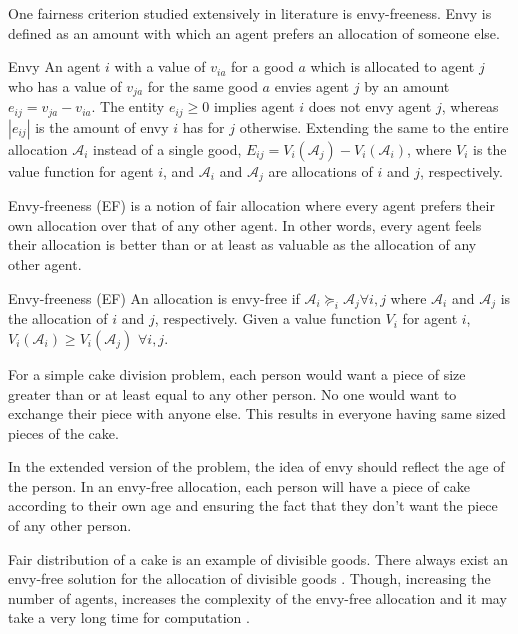 One fairness criterion studied extensively in literature is envy-freeness. Envy is defined as an amount with which an agent prefers an allocation of someone else. 

\begin{definition}{Envy}
\label{def_envy}
An agent $i$ with a value of $v_{ia}$ for a good $a$ which is allocated to agent $j$ who has a value of $v_{ja}$ for the same good $a$ envies agent $j$ by an
amount $e_{ij} = v_{ja} - v_{ia}$. The entity $e_{ij} \geq 0$ implies agent $i$ does not envy agent $j$, whereas $|e_{ij}|$ is the amount of envy $i$ has for $j$ otherwise. Extending the same to the entire allocation $\mathcal{A}_i$ instead of a single good, $E_{ij} = V_i(\mathcal{A}_j) - V_i(\mathcal{A}_i)$, where $V_i$ is the value function for agent $i$, and $\mathcal{A}_i$ and $\mathcal{A}_j$ are allocations of $i$ and $j$, respectively.
\end{definition}

Envy-freeness (EF) is a notion of fair allocation where every agent prefers their own allocation over that of any other agent. In other words, every agent feels their allocation is better than or at least as valuable as the allocation of any other agent.


\begin{definition}{Envy-freeness (EF)}
\label{def_envyfree}
An allocation is envy-free if $\mathcal{A}_i \succeq_i \mathcal{A}_j \forall i,j$ where $\mathcal{A}_i$ and $\mathcal{A}_j$ is the allocation of $i$ and $j$, respectively. Given a value function $V_i$ for agent $i$, $V_i(\mathcal{A}_i) \geq V_i(\mathcal{A}_j)$ $\forall i,j$. 
\end{definition}

For a simple cake division problem, each person would want a piece of size greater than or at least equal to any other person. No one would want to exchange their piece with anyone else. This results in everyone having same sized pieces of the cake.

In the extended version of the problem, the idea of envy should reflect the age of the person. In an envy-free allocation, each person will have a piece of cake according to their own age and ensuring the fact that they don't want the piece of any other person. 

Fair distribution of a cake is an example of divisible goods. There always exist an envy-free solution for the allocation of divisible goods \cite{stern1958puzzle}. Though, increasing the number of agents, increases the complexity of the envy-free allocation and it may take a very long time for computation \cite{aziz2016discrete}.

